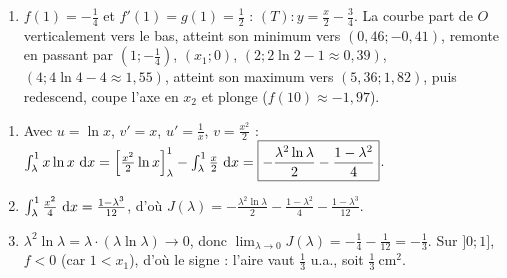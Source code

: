 \begin{corrige}
\begin{sol}
\begin{description}
\begin{enumerate}
      \item $f(1) = -\frac{1}{4}$ et $f'(1) = g(1) = \frac{1}{2}$ : $\boxed{(T) : y = \frac{x}{2} - \frac{3}{4}}$.
            La courbe part de $O$ verticalement vers le bas, atteint son minimum vers $(0{,}46 ; -0{,}41)$, remonte en passant par
            $\left(1 ; -\frac{1}{4}\right)$, $(x_1 ; 0)$, $(2 ; 2\ln 2 - 1 \approx 0{,}39)$, $(4 ; 4\ln 4 - 4 \approx 1{,}55)$, atteint son maximum
            vers $(5{,}36 ; 1{,}82)$, puis redescend, coupe l'axe en $x_2$ et plonge ($f(10) \approx -1{,}97$).
      \end{enumerate}
\item[Partie C.] \begin{enumerate}
      \item Avec $u = \ln x$, $v' = x$, $u' = \frac{1}{x}$, $v = \frac{x^2}{2}$ :
            $\int_\lambda^1 x\ln x~\mathrm{d}x = \left[ \frac{x^2}{2}\ln x \right]_\lambda^1 - \int_\lambda^1 \frac{x}{2}~\mathrm{d}x
            = \boxed{-\frac{\lambda^2\ln\lambda}{2} - \frac{1 - \lambda^2}{4}}$.
      \item $\int_\lambda^1 \frac{x^2}{4}~\mathrm{d}x = \frac{1 - \lambda^3}{12}$, d'o\`u
            $\boxed{J(\lambda) = -\frac{\lambda^2\ln\lambda}{2} - \frac{1 - \lambda^2}{4} - \frac{1 - \lambda^3}{12}}$.
      \item $\lambda^2\ln\lambda = \lambda \cdot (\lambda\ln\lambda) \to 0$, donc $\lim_{\lambda\to 0} J(\lambda) = -\frac{1}{4} - \frac{1}{12} = -\frac{1}{3}$.
            Sur $]0 ; 1]$, $f < 0$ (car $1 < x_1$), d'o\`u le signe : l'aire vaut $\frac{1}{3}$ u.a., soit
            $\boxed{\frac{1}{3}~\text{cm}^2}$.
      \end{enumerate}
\end{description}
\end{sol}


\end{corrige}
